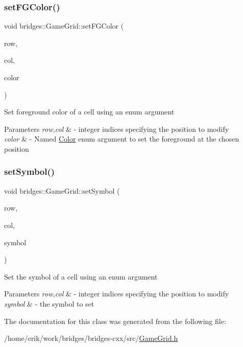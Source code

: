 \subsubsection{\texorpdfstring{set\+F\+G\+Color()}{setFGColor()}}
{\footnotesize\ttfamily void bridges\+::\+Game\+Grid\+::set\+F\+G\+Color (\begin{DoxyParamCaption}\item[{int}]{row,  }\item[{int}]{col,  }\item[{\hyperlink{namespacebridges_ad811207d8898a7fd6b72a74725e68357}{Named\+Color}}]{color }\end{DoxyParamCaption})\hspace{0.3cm}{\ttfamily [inline]}}

Set foreground color of a cell using an enum argument


\begin{DoxyParams}{Parameters}
{\em row,col} & -\/ integer indices specifying the position to modify \\
\hline
{\em color} & -\/ Named \hyperlink{classbridges_1_1_color}{Color} enum argument to set the foreground at the chosen position \\
\hline
\end{DoxyParams}
\mbox{\label{classbridges_1_1_game_grid_a733c0e0cd549248292e08a2dca09637e}} 
\subsubsection{\texorpdfstring{set\+Symbol()}{setSymbol()}}
{\footnotesize\ttfamily void bridges\+::\+Game\+Grid\+::set\+Symbol (\begin{DoxyParamCaption}\item[{int}]{row,  }\item[{int}]{col,  }\item[{\hyperlink{namespacebridges_acfb0a4f7877d8f63de3e6862004c50ed}{Named\+Symbol}}]{symbol }\end{DoxyParamCaption})\hspace{0.3cm}{\ttfamily [inline]}}

Set the symbol of a cell using an enum argument


\begin{DoxyParams}{Parameters}
{\em row,col} & -\/ integer indices specifying the position to modify \\
\hline
{\em symbol} & -\/ the symbol to set \\
\hline
\end{DoxyParams}


The documentation for this class was generated from the following file\+:\begin{DoxyCompactItemize}
\item 
/home/erik/work/bridges/bridges-\/cxx/src/\hyperlink{_game_grid_8h}{Game\+Grid.\+h}\end{DoxyCompactItemize}
